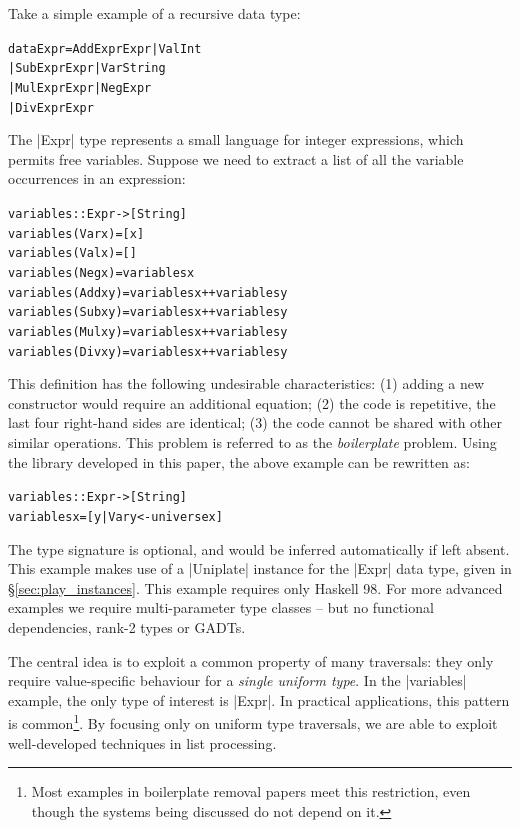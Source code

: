 \documentclass[preprint]{sigplanconf}
\newenvironment{code}{\begin{alltt}\small}{\end{alltt}}
\begin{document}
Take a simple example of a recursive data type:

\begin{code}
data Expr  =  Add  Expr  Expr  |  Val  Int
           |  Sub  Expr  Expr  |  Var  String
           |  Mul  Expr  Expr  |  Neg  Expr
           |  Div  Expr  Expr
\end{code}

The |Expr| type represents a small language for integer expressions, which permits free variables. Suppose we need to extract a list of all the variable occurrences in an expression:

\begin{code}
variables :: Expr -> [String]
variables (Var  x    ) = [x]
variables (Val  x    ) = []
variables (Neg  x    ) = variables x
variables (Add  x y  ) = variables x ++ variables y
variables (Sub  x y  ) = variables x ++ variables y
variables (Mul  x y  ) = variables x ++ variables y
variables (Div  x y  ) = variables x ++ variables y
\end{code}

This definition has the following undesirable characteristics: (1) adding a new constructor would require an additional equation; (2) the code is repetitive, the last four right-hand sides are identical; (3) the code cannot be shared with other similar operations. This problem is referred to as the \textit{boilerplate} problem. Using the library developed in this paper, the above example can be rewritten as:

\begin{code}
variables :: Expr -> [String]
variables x = [y | Var y <- universe x]
\end{code}

The type signature is optional, and would be inferred automatically if left absent. This example makes use of a |Uniplate| instance for the |Expr| data type, given in \S\ref{sec:play_instances}. This example requires only Haskell 98. For more advanced examples we require multi-parameter type classes -- but no functional dependencies, rank-2 types or GADTs.

The central idea is to exploit a common property of many traversals: they only require value-specific behaviour for a \textit{single uniform type}. In the |variables| example, the only type of interest is |Expr|. In practical applications, this pattern is common\footnote{Most examples in boilerplate removal papers meet this restriction, even though the systems being discussed do not depend on it.}. By focusing only on uniform type traversals, we are able to exploit well-developed techniques in list processing.
\end{document}
